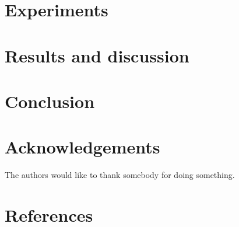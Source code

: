 \documentclass[12pt,5p, authoryear]{elsarticle}
\begin{document}

\section{Experiments}

\blindtext[1]


\section{Results and discussion}

\blindtext[1]

\section{Conclusion}

\blindtext[1]





\section*{Acknowledgements}
The authors would like to thank somebody for doing something.



\section*{References}
 




\newpage

\newpage


\end{document}
